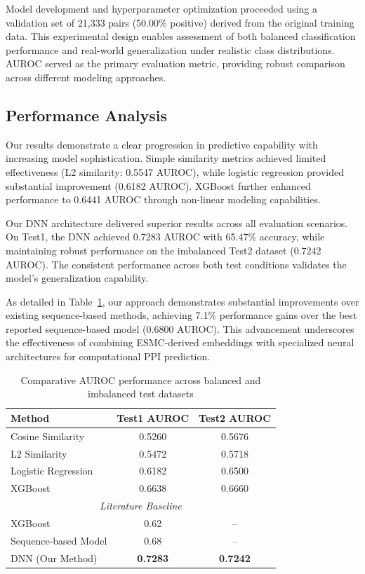 \documentclass{article}
\begin{document}
	Model development and hyperparameter optimization proceeded using a validation set of 21,333 pairs (50.00\% positive) derived from the original training data. This experimental design enables assessment of both balanced classification performance and real-world generalization under realistic class distributions. AUROC served as the primary evaluation metric, providing robust comparison across different modeling approaches.

	\subsection{Performance Analysis}

	Our results demonstrate a clear progression in predictive capability with increasing model sophistication. Simple similarity metrics achieved limited effectiveness (L2 similarity: 0.5547 AUROC), while logistic regression provided substantial improvement (0.6182 AUROC). XGBoost further enhanced performance to 0.6441 AUROC through non-linear modeling capabilities.

	Our DNN architecture delivered superior results across all evaluation scenarios. On Test1, the DNN achieved 0.7283 AUROC with 65.47\% accuracy, while maintaining robust performance on the imbalanced Test2 dataset (0.7242 AUROC). The consistent performance across both test conditions validates the model's generalization capability.

	As detailed in Table~\ref{tab:results}, our approach demonstrates substantial improvements over existing sequence-based methods, achieving 7.1\% performance gains over the best reported sequence-based model (0.6800 AUROC). This advancement underscores the effectiveness of combining ESMC-derived embeddings with specialized neural architectures for computational PPI prediction.

	\begin{table}[h]
	\caption{Comparative AUROC performance across balanced and imbalanced test datasets}
	\label{tab:results}
	\centering
	\begin{tabular}{lcc}
	\toprule
	\textbf{Method} & \textbf{Test1 AUROC} & \textbf{Test2 AUROC}\\
	\midrule
	Cosine Similarity & 0.5260 & 0.5676\\
	L2 Similarity & 0.5472 & 0.5718\\
	Logistic Regression & 0.6182 & 0.6500\\
	XGBoost & 0.6638 & 0.6660\\
	\midrule
	\multicolumn{3}{c}{\textit{Literature Baseline}}\\
	\midrule
	XGBoost & 0.62 & --\\
	Sequence-based Model & 0.68 & --\\
	\midrule
	DNN (Our Method) & \textbf{0.7283} & \textbf{0.7242}\\
	\bottomrule
	\end{tabular}
	\end{table}
\end{document}
